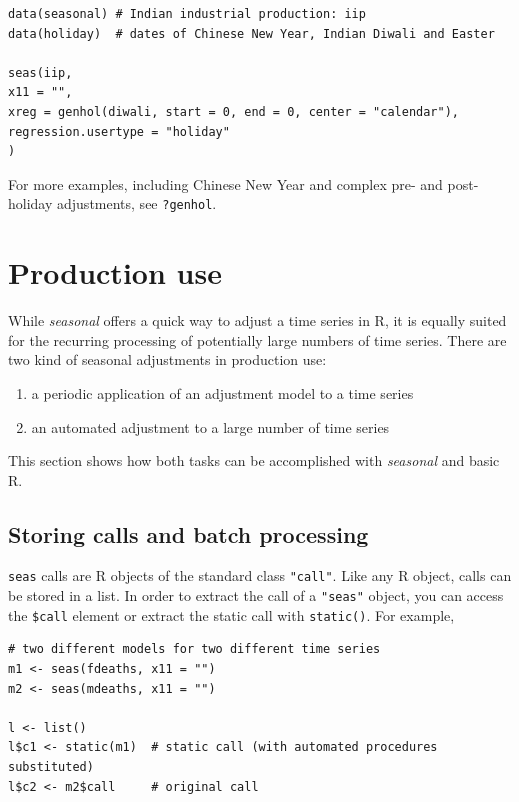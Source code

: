 \begin{verbatim}
data(seasonal) # Indian industrial production: iip
data(holiday)  # dates of Chinese New Year, Indian Diwali and Easter

seas(iip, 
x11 = "",
xreg = genhol(diwali, start = 0, end = 0, center = "calendar"), 
regression.usertype = "holiday"
)
\end{verbatim}

For more examples, including Chinese New Year and complex pre- and
post-holiday adjustments, see \texttt{?genhol}.

\section{Production use}\label{production-use}

While \emph{seasonal} offers a quick way to adjust a time series in R,
it is equally suited for the recurring processing of potentially large
numbers of time series. There are two kind of seasonal adjustments in
production use:

\begin{enumerate}
\def\labelenumi{\arabic{enumi}.}
\itemsep1pt\parskip0pt
\item
  a periodic application of an adjustment model to a time series
\item
  an automated adjustment to a large number of time series
\end{enumerate}

This section shows how both tasks can be accomplished with
\emph{seasonal} and basic R.

\subsection{Storing calls and batch
processing}\label{storing-calls-and-batch-processing}

\texttt{seas} calls are R objects of the standard class \texttt{"call"}.
Like any R object, calls can be stored in a list. In order to extract
the call of a \texttt{"seas"} object, you can access the \texttt{\$call}
element or extract the static call with \texttt{static()}. For example,

\begin{verbatim}
# two different models for two different time series
m1 <- seas(fdeaths, x11 = "")
m2 <- seas(mdeaths, x11 = "")

l <- list()
l$c1 <- static(m1)  # static call (with automated procedures substituted)
l$c2 <- m2$call     # original call
\end{verbatim}

